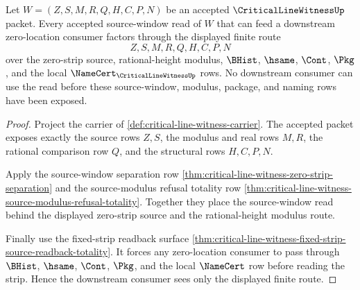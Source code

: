 \begin{theorem}
\label{thm:critical-line-witness-window-modulus-exhaustion}
Let $W=(Z,S,M,R,Q,H,C,P,N)$ be an accepted $\CriticalLineWitnessUp$ packet. Every accepted source-window read of $W$ that can feed a downstream zero-location consumer factors through the displayed finite route
$$
Z,S,M,R,Q,H,C,P,N
$$
over the zero-strip source, rational-height modulus, $\BHist$, $\hsame$, $\Cont$, $\Pkg$, and the local $\NameCert_{\CriticalLineWitnessUp}$ rows. No downstream consumer can use the read before these source-window, modulus, package, and naming rows have been exposed.
\end{theorem}
\begin{proof}
Project the carrier of \autoref{def:critical-line-witness-carrier}. The accepted packet exposes exactly the source rows $Z,S$, the modulus and real rows $M,R$, the rational comparison row $Q$, and the structural rows $H,C,P,N$.

Apply the source-window separation row \autoref{thm:critical-line-witness-zero-strip-separation} and the source-modulus refusal totality row \autoref{thm:critical-line-witness-source-modulus-refusal-totality}. Together they place the source-window read behind the displayed zero-strip source and the rational-height modulus route.

Finally use the fixed-strip readback surface \autoref{thm:critical-line-witness-fixed-strip-source-readback-totality}. It forces any zero-location consumer to pass through $\BHist$, $\hsame$, $\Cont$, $\Pkg$, and the local $\NameCert$ row before reading the strip. Hence the downstream consumer sees only the displayed finite route.
\end{proof}


